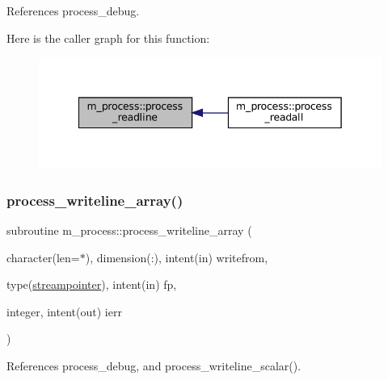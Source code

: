 References process\+\_\+debug.

Here is the caller graph for this function\+:\nopagebreak
\begin{figure}[H]
\begin{center}
\leavevmode
\includegraphics[width=342pt]{namespacem__process_acbc72c5ed371430a471aa1f3010fbbda_icgraph}
\end{center}
\end{figure}
\mbox{\label{namespacem__process_a08887a918eba167ceacddf58ca084270}} 
\subsubsection{\texorpdfstring{process\+\_\+writeline\+\_\+array()}{process\_writeline\_array()}}
{\footnotesize\ttfamily subroutine m\+\_\+process\+::process\+\_\+writeline\+\_\+array (\begin{DoxyParamCaption}\item[{character(len=$\ast$), dimension(\+:), intent(in)}]{writefrom,  }\item[{type(\mbox{\hyperlink{structm__process_1_1streampointer}{streampointer}}), intent(in)}]{fp,  }\item[{integer, intent(out)}]{ierr }\end{DoxyParamCaption})\hspace{0.3cm}{\ttfamily [private]}}



References process\+\_\+debug, and process\+\_\+writeline\+\_\+scalar().

